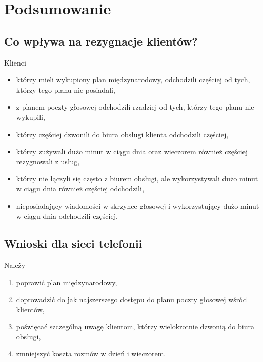 \documentclass{article}\usepackage[]{graphicx}\usepackage[]{color}
\begin{document}
\section{Podsumowanie}
\subsection{Co wpływa na rezygnacje klientów?}
Klienci
\begin{itemize}
  \item którzy mieli wykupiony plan międzynarodowy, odchodzili częściej od tych, którzy tego planu nie posiadali,
  \item z planem poczty głosowej odchodzili rzadziej od tych, którzy tego planu nie wykupili,
  \item którzy częściej dzwonili do biura obsługi klienta odchodzili częściej,
  \item którzy zużywali dużo minut w ciągu dnia oraz wieczorem również częściej rezygnowali z usług,
  \item którzy nie łączyli się często z biurem obsługi, ale wykorzystywali dużo minut w ciągu dnia również częściej odchodzili,
  \item nieposiadający wiadomości w skrzynce głosowej i wykorzystujący dużo minut w ciągu dnia odchodzili częściej.
\end{itemize}

\subsection{Wnioski dla sieci telefonii}
Należy
\begin{enumerate}
\item poprawić plan międzynarodowy,
\item doprowadzić do jak najszerszego dostępu do planu poczty głosowej wśród klientów,
\item poświęcać szczególną uwagę klientom, którzy wielokrotnie dzwonią do biura obsługi,
\item zmniejszyć koszta rozmów w dzień i wieczorem.
\end{enumerate}
\end{document}
